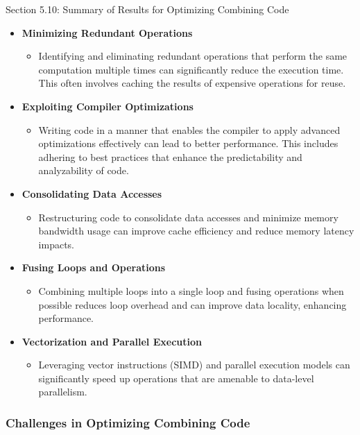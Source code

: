 \begin{notes}{Section 5.10: Summary of Results for Optimizing Combining Code}
    \begin{itemize}
        \item \textbf{Minimizing Redundant Operations}
        \begin{itemize}
            \item Identifying and eliminating redundant operations that perform the same computation multiple times can significantly reduce the execution time. This often involves caching the results 
            of expensive operations for reuse.
        \end{itemize}
        \item \textbf{Exploiting Compiler Optimizations}
        \begin{itemize}
            \item Writing code in a manner that enables the compiler to apply advanced optimizations effectively can lead to better performance. This includes adhering to best practices that enhance 
            the predictability and analyzability of code.
        \end{itemize}
        \item \textbf{Consolidating Data Accesses}
        \begin{itemize}
            \item Restructuring code to consolidate data accesses and minimize memory bandwidth usage can improve cache efficiency and reduce memory latency impacts.
        \end{itemize}
        \item \textbf{Fusing Loops and Operations}
        \begin{itemize}
            \item Combining multiple loops into a single loop and fusing operations when possible reduces loop overhead and can improve data locality, enhancing performance.
        \end{itemize}
        \item \textbf{Vectorization and Parallel Execution}
        \begin{itemize}
            \item Leveraging vector instructions (SIMD) and parallel execution models can significantly speed up operations that are amenable to data-level parallelism.
        \end{itemize}
    \end{itemize}
    
    \subsubsection*{Challenges in Optimizing Combining Code}
    

\end{notes}
